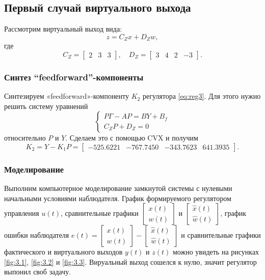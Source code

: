 \subsection{Первый случай виртуального выхода}

Рассмотрим виртуальный выход вида:
\begin{equation*}
    z=C_Zx+D_Zw,
\end{equation*}
где
\begin{equation*}
    C_Z=\begin{bmatrix}
        2&3&3
    \end{bmatrix},\quad
    D_Z=\begin{bmatrix}
        3&4&2&-3
    \end{bmatrix}.
\end{equation*}

\subsubsection{Синтез ``feedforward''-компоненты}
Синтезируем «feedforward»-компоненту $K_2$ регулятора \eqref{eq:reg3}.
Для этого нужно решить систему уравнений
\begin{equation}
    \label{eq:getk2}
    \begin{cases}
        P\Gamma-AP=BY+B_f\\
        C_ZP+D_Z=0
    \end{cases}
\end{equation}
относительно $P$ и $Y$. Сделаем это с помощью CVX и получим
\begin{equation*}
    K_2=Y-K_1P=\begin{bmatrix}
        -525.6221&	-767.7450	&-343.7623	&641.3935
    \end{bmatrix}.
\end{equation*}

\subsubsection{Моделирование}

Выполним компьютерное моделирование замкнутой системы с нулевыми
начальными условиями наблюдателя. График формируемого регулятором 
управления $u(t)$, сравнительные графики
$\begin{bmatrix}
    x(t)\\w(t)
\end{bmatrix}$ и
$\begin{bmatrix}
    \hat x(t)\\\hat w(t)
\end{bmatrix}$, 
график ошибки наблюдателя $e(t)=\begin{bmatrix}
    x(t)\\w(t)
\end{bmatrix} - \begin{bmatrix}
    \hat x(t)\\\hat w(t)
\end{bmatrix}$
и сравнительные графики фактического и виртуального выходов $y(t)$ и $z(t)$
можно увидеть на рисунках \ref{fig:3.1}, \ref{fig:3.2} и \ref{fig:3.3}.
Вируальный выход сошелся к нулю, значит регулятор выпонил своб задачу.

